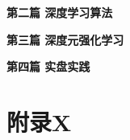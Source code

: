 \documentclass[UTF8]{article}
\begin{document}
\newpage
\maketitle
\begin{center}
\quad \newline \quad \newline \quad \newline \quad \newline \quad \newline \quad \newline \quad \newline \quad \newline \quad \newline \quad \newline
\Large \textbf{第二篇 深度学习算法} \quad \textbf{}
\end{center}




\newpage
\maketitle
\begin{center}
\quad \newline \quad \newline \quad \newline \quad \newline \quad \newline \quad \newline \quad \newline \quad \newline \quad \newline \quad \newline
\Large \textbf{第三篇 深度元强化学习} \quad \textbf{}
\end{center}




\newpage
\maketitle
\begin{center}
\quad \newline \quad \newline \quad \newline \quad \newline \quad \newline \quad \newline \quad \newline \quad \newline \quad \newline \quad \newline
\Large \textbf{第四篇 实盘实践} \quad \textbf{}
\end{center}





\section{附录X}

\newpage




\appendix
\end{document}
